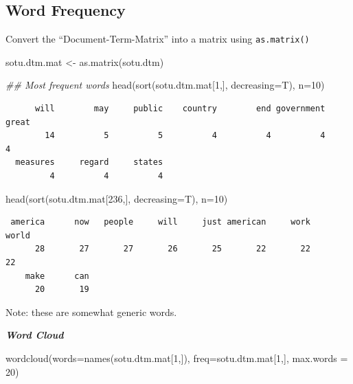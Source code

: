 \documentclass[
  letterpaper,
  DIV=11,
  numbers=noendperiod]{scrreprt}
\newenvironment{Shaded}{\begin{snugshade}}{\end{snugshade}}
\newcommand{\AttributeTok}[1]{\textcolor[rgb]{0.40,0.45,0.13}{#1}}
\newcommand{\DecValTok}[1]{\textcolor[rgb]{0.68,0.00,0.00}{#1}}
\newcommand{\DocumentationTok}[1]{\textcolor[rgb]{0.37,0.37,0.37}{\textit{#1}}}
\newcommand{\FunctionTok}[1]{\textcolor[rgb]{0.28,0.35,0.67}{#1}}
\newcommand{\NormalTok}[1]{\textcolor[rgb]{0.00,0.23,0.31}{#1}}
\newcommand{\OtherTok}[1]{\textcolor[rgb]{0.00,0.23,0.31}{#1}}
\begin{document}
\hypertarget{word-frequency}{%
\subsection{Word Frequency}\label{word-frequency}}

Convert the ``Document-Term-Matrix'' into a matrix using
\texttt{as.matrix()}

\begin{Shaded}
\begin{Highlighting}[]
\NormalTok{sotu.dtm.mat }\OtherTok{\textless{}{-}} \FunctionTok{as.matrix}\NormalTok{(sotu.dtm)}

\DocumentationTok{\#\# Most frequent words}
\FunctionTok{head}\NormalTok{(}\FunctionTok{sort}\NormalTok{(sotu.dtm.mat[}\DecValTok{1}\NormalTok{,], }\AttributeTok{decreasing=}\NormalTok{T), }\AttributeTok{n=}\DecValTok{10}\NormalTok{)}
\end{Highlighting}
\end{Shaded}

\begin{verbatim}
      will        may     public    country        end government      great 
        14          5          5          4          4          4          4 
  measures     regard     states 
         4          4          4 
\end{verbatim}

\begin{Shaded}
\begin{Highlighting}[]
\FunctionTok{head}\NormalTok{(}\FunctionTok{sort}\NormalTok{(sotu.dtm.mat[}\DecValTok{236}\NormalTok{,], }\AttributeTok{decreasing=}\NormalTok{T), }\AttributeTok{n=}\DecValTok{10}\NormalTok{)}
\end{Highlighting}
\end{Shaded}

\begin{verbatim}
 america      now   people     will     just american     work    world 
      28       27       27       26       25       22       22       22 
    make      can 
      20       19 
\end{verbatim}

Note: these are somewhat generic words.

\textbf{\emph{Word Cloud}}

\begin{Shaded}
\begin{Highlighting}[]
\FunctionTok{wordcloud}\NormalTok{(}\AttributeTok{words=}\FunctionTok{names}\NormalTok{(sotu.dtm.mat[}\DecValTok{1}\NormalTok{,]),}
          \AttributeTok{freq=}\NormalTok{sotu.dtm.mat[}\DecValTok{1}\NormalTok{,], }\AttributeTok{max.words =} \DecValTok{20}\NormalTok{)}
\end{Highlighting}
\end{Shaded}
\end{document}
